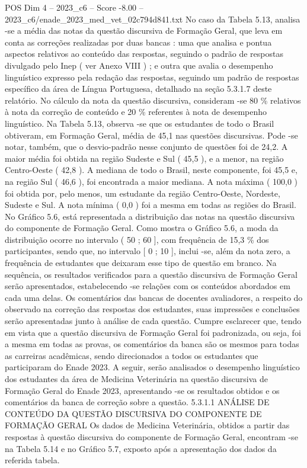 \begin{textsample}{POS Dim 4 – 2023\_c6 – Score -8.00 – 2023\_c6/enade\_2023\_med\_vet\_02c794d841.txt}
No caso da Tabela 5.13, analisa -se a média das notas da questão discursiva de Formação Geral, que leva em conta as correções realizadas por duas bancas : uma que analisa e pontua aspectos relativos ao conteúdo das respostas, seguindo o padrão de respostas divulgado pelo Inep ( ver Anexo VIII ) ; e outra que avalia o desempenho linguístico expresso pela redação das respostas, seguindo um padrão de respostas específico da área de Língua Portuguesa, detalhado na seção 5.3.1.7 deste relatório.
No cálculo da nota da questão discursiva, consideram -se 80 \% relativos à nota da correção de conteúdo e 20 \% referentes à nota de desempenho linguístico.
Na Tabela 5.13, observa -se que os estudantes de todo o Brasil obtiveram, em Formação Geral, média de 45,1 nas questões discursivas.
Pode -se notar, também, que o desvio-padrão nesse conjunto de questões foi de 24,2.
A maior média foi obtida na região Sudeste e Sul ( 45,5 ), e a menor, na região Centro-Oeste ( 42,8 ).
A mediana de todo o Brasil, neste componente, foi 45,5 e, na região Sul ( 46,6 ), foi encontrada a maior mediana.
A nota máxima ( 100,0 ) foi obtida por, pelo menos, um estudante da região Centro-Oeste, Nordeste, Sudeste e Sul.
A nota mínima ( 0,0 ) foi a mesma em todas as regiões do Brasil.
No Gráfico 5.6, está representada a distribuição das notas na questão discursiva do componente de Formação Geral.
Como mostra o Gráfico 5.6, a moda da distribuição ocorre no intervalo ( 50 ; 60 ], com frequência de 15,3 \% dos participantes, sendo que, no intervalo [ 0 ; 10 ], inclui -se, além da nota zero, a frequência de estudantes que deixaram esse tipo de questão em branco.
Na sequência, os resultados verificados para a questão discursiva de Formação Geral serão apresentados, estabelecendo -se relações com os conteúdos abordados em cada uma delas.
Os comentários das bancas de docentes avaliadores, a respeito do observado na correção das respostas dos estudantes, suas impressões e conclusões serão apresentadas junto à análise de cada questão.
Cumpre esclarecer que, tendo em vista que a questão discursiva de Formação Geral foi padronizada, ou seja, foi a mesma em todas as provas, os comentários da banca são os mesmos para todas as carreiras acadêmicas, sendo direcionados a todos os estudantes que participaram do Enade 2023.
A seguir, serão analisados o desempenho linguístico dos estudantes da área de Medicina Veterinária na questão discursiva de Formação Geral do Enade 2023, apresentando -se os resultados obtidos e os comentários da banca de correção sobre a questão. 5.3.1.1 ANÁLISE DE CONTEÚDO DA QUESTÃO DISCURSIVA DO COMPONENTE DE FORMAÇÃO GERAL Os dados de Medicina Veterinária, obtidos a partir das respostas à questão discursiva do componente de Formação Geral, encontram -se na Tabela 5.14 e no Gráfico 5.7, exposto após a apresentação dos dados da referida tabela.

\end{textsample}
